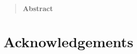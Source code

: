 \documentclass{99-Styles/MICE}
\begin{document}


\makeatletter



\parindent 10pt
\pagestyle{plain}
\setcounter{page}{1}

\begin{quotation}
\begin{center}
\textbf{Abstract}
\end{center}

\noindent

\end{quotation}





 




\section{Acknowledgements}
\label{Sect:Acknowledgements}


\clearpage



\newpage
\appendix

\end{document}
